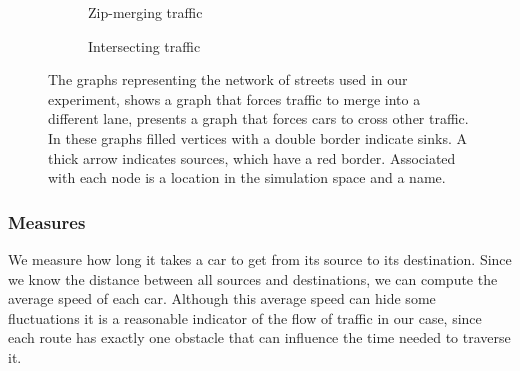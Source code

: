 \begin{figure}
	\centering
	\begin{subfigure}{0.49\textwidth}
		\centering
		
		\caption{Zip-merging traffic}
		\label{fig:method:experiment:merging}
	\end{subfigure}
	\begin{subfigure}{0.49\textwidth}
		\centering
		
		\caption{Intersecting traffic}
		\label{fig:method:experiment:intersection}
	\end{subfigure}	
	\caption{The graphs representing the network of streets used in our experiment,  shows a graph that forces traffic to merge into a different lane,  presents a graph that forces cars to cross other traffic. In these graphs filled vertices with a double border indicate sinks. A thick arrow indicates sources, which have a red border. Associated with each node is a location in the simulation space and a name.}
	\label{fig:method:experimentGraphs}
\end{figure}

\subsubsection{Measures}
\label{ss:method:experiment:measures}
We measure how long it takes a car to get from its source to its destination. Since we know the distance between all sources and destinations, we can compute the average speed of each car. Although this average speed can hide some fluctuations it is a reasonable indicator of the flow of traffic in our case, since each route has exactly one obstacle that can influence the time needed to traverse it. 